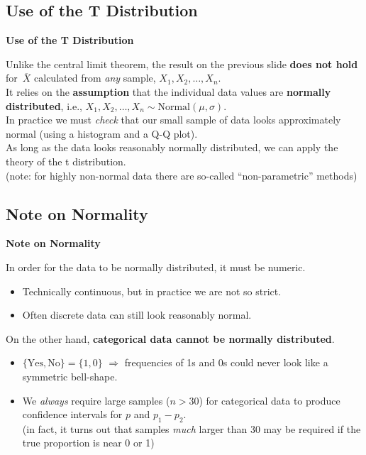 \documentclass[compress]{beamer}        %
\makeatletter
\newcommand{\tcb}{\textcolor{beamer@blendedblue}}
\makeatother
\begin{document}
\subsection{Use of the T Distribution}
\begin{frame}{\bf \tcb{Use of the T Distribution}}


Unlike the central limit theorem, the result on the previous slide {\bf does not hold} for $\,\overline{\!X}$ calculated from \emph{any} sample, $X_1,X_2,\ldots,X_n$.\\[0.8cm]

It relies on the {\bf assumption} that the individual data values are {\bf normally distributed}, i.e.,  $X_1,X_2,\ldots,X_n \sim \text{Normal}(\mu,\sigma).$\\[0.8cm]

In practice we must \emph{check} that our small sample of data looks approximately normal (using a histogram and a Q-Q plot).\\[0.8cm]

As long as the data looks reasonably normally distributed, we can apply the theory of the t distribution.\\[0.2cm]
{\footnotesize(note: for highly non-normal data there are so-called ``non-parametric'' methods)}

\end{frame}



\subsection{Note on Normality}
\begin{frame}{\bf \tcb{Note on Normality}}

In order for the data to be normally distributed, it must be numeric.\\[0.2cm]
\begin{itemize}\itemsep0.3cm
\item Technically continuous, but in practice we are not so strict.
\item Often discrete data can still look reasonably normal.\\[1.2cm]
\end{itemize}

On the other hand, {\bf categorical data cannot be normally distributed}.\\[0.2cm]
\begin{itemize}\itemsep0.3cm
\item $\{\text{Yes}, \text{No}\} = \{1,0\}$ $\Rightarrow$ frequencies of 1s and 0s could never look like a symmetric bell-shape.
\item We \emph{always} require large samples ($n>30$) for categorical data to produce confidence intervals for $p$ and $p_1-p_2$.\\[0.2cm]
{\footnotesize(in fact, it turns out that samples \emph{much} larger than 30 may be required if the true proportion is near 0 or 1)}
\end{itemize}

\end{frame}
\end{document}
